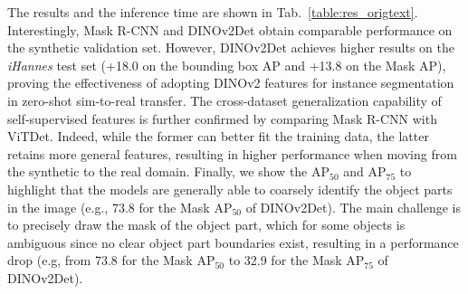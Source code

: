 The results and the inference time are shown in Tab.~\ref{table:res_origtext}. Interestingly, Mask R-CNN and DINOv2Det obtain comparable performance on the synthetic validation set. However, DINOv2Det achieves higher results on the \textit{iHannes} test set (+18.0 on the bounding box AP and +13.8 on the Mask AP), proving the effectiveness of adopting DINOv2 features for instance segmentation in zero-shot sim-to-real transfer. The cross-dataset generalization capability of self-supervised features is further confirmed by comparing Mask R-CNN with ViTDet. Indeed, while the former can better fit the training data, the latter retains more general features, resulting in higher performance when moving from the synthetic to the real domain. Finally, we show the AP$_{50}$ and AP$_{75}$ to highlight that the models are generally able to coarsely identify the object parts in the image (e.g., 73.8 for the Mask AP$_{50}$ of DINOv2Det). The main challenge is to precisely draw the mask of the object part, which for some objects is ambiguous since no clear object part boundaries exist, resulting in a performance drop (e.g, from 73.8 for the Mask AP$_{50}$ to 32.9 for the Mask AP$_{75}$ of DINOv2Det).
\begin{comment}
\noindent\textbf{Ablation on DINOv2Det} Since DINOv2 is a recently proposed method, it is not well-known how to fine-tune it, especially when applied to instance segmentation as downstream task. In this matter, we investigate both different fine-tuning strategies and whether the Simple Feature Pyramid (SFP) introduced in~\cite{li2022} is still useful or not. We consider three training strategies: (i) \textit{Heads}, the backbone is freezed while the RPN and the RoI heads are trained; (ii) \textit{Heads + 4 last layers}, also the 4 last layers (out of 12) of the backbone are trained; (iii) \textit{Heads + all layers}, the DINOv2Det is trained end-to-end. For the first training strategy, the weights of the backbone are loaded from the official DINOv2 repository while the RPN and the RoI heads are randomly initialized. 
The weights of the best performing checkpoint on the validation set are used as initialization for the other two training strategies, since it led to slightly better results than randomly initializing the heads. As shown in Table~\ref{table:res_abl}, differently from~\cite{li2022}, there is no improvement in using the SFP, this may be due to DINOv2 being already powerful enough to capture the object parts at the given scales. Moreover, the last two training strategies clearly outperforms the first one, both on the synthetic and real data. Finally, qualitative results are available in the supplementary video.
\end{comment}

